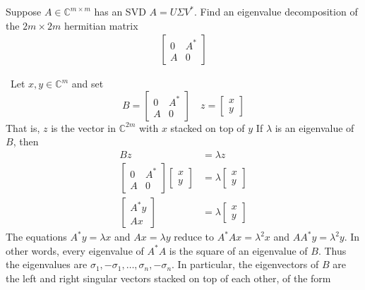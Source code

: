 \documentclass[12pt]{article}
\newenvironment{ex}[2][Exercise]{\begin{trivlist}
		\item[\hskip \labelsep {\bfseries #1}\hskip \labelsep {\bfseries #2.}]}{\end{trivlist}}
\newenvironment{sol}[1][Solution]{\begin{trivlist}
		\item[\hskip \labelsep {\bfseries #1:}]}{\end{trivlist}}
\begin{document}
\begin{ex}{5.4}
	Suppose $A\in\mathbb{C}^{m\times m}$ has an SVD $A=U\Sigma V^*$. Find an eigenvalue decomposition of the
	$2m\times 2m$ hermitian matrix
	\begin{align*}
		\begin{bmatrix}
			0 & A^*\\
			A & 0
		\end{bmatrix}
	\end{align*}
\end{ex}

\begin{sol}
	\
	Let $x,y\in\mathbb{C}^m$ and set
	\[
	B=\begin{bmatrix}
		0 & A^*\\
		A & 0
	\end{bmatrix}
	\quad
	z=\begin{bmatrix}
		x\\
		y
	\end{bmatrix}
	\]
	That is, $z$ is the vector in $\mathbb{C}^{2m}$ with $x$ stacked on top of $y$ If $\lambda$ is an eigenvalue of $B$,
	then
	\begin{align*}
		Bz&=\lambda z\\
		\begin{bmatrix}
			0 & A^*\\
			A & 0
		\end{bmatrix}
		\begin{bmatrix}
			x\\
			y
		\end{bmatrix}
		&=
		\lambda \begin{bmatrix}
			x\\
			y
		\end{bmatrix}\\
		\begin{bmatrix}
			A^*y\\
			Ax
		\end{bmatrix}
		&=
		\lambda \begin{bmatrix}
			x\\
			y
		\end{bmatrix}
	\end{align*}
	The equations $A^*y=\lambda x$ and $Ax=\lambda y$ reduce to $A^*Ax=\lambda^2x$ and $AA^*y=\lambda^2y$.
	In other words, every eigenvalue of $A^*A$ is the square of an eigenvalue of $B$. Thus the eigenvalues
	are $\sigma_1,-\sigma_1,\ldots,\sigma_n,-\sigma_n$. In particular, the eigenvectors of $B$ are the
	left and right singular vectors stacked on top of each other, of the form
	\begin{align*}

\end{align*}
\end{sol}
\end{document}

